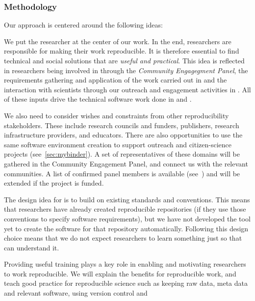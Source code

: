 \subsubsection{Methodology}\label{sec:methodology}

Our approach is centered around the following ideas:
\begin{compactenum}
  \item We put the researcher at the center of our work. In the end,
    researchers are responsible for making their work
    reproducible. It is therefore essential to find technical and social solutions
    that are \emph{useful and practical}. This idea is reflected in researchers
    being involved in  through the \emph{Community Engagegment
    Panel}, the requirements gathering and application of the work carried out
  in  and the interaction with scientists through our
  outreach and engagement activities in . All of these inputs
  drive the technical software work done in  and .
\item We also need to consider wishes and constraints from other reproducibility
  stakeholders. These include research councils and funders, publishers, research
  infrastructure providers, and educators. There are also opportunities to use the same
  software environment creation to support outreach and
  citizen-science projects (see~\ref{sec:mybinder}). A set of representatives of
  these domains will be gathered in the Community Engagement Panel, and connect
  us with the relevant communities. A list of confirmed panel members is
  available (see~) and will be
  extended if the project is funded.
\item The design idea for \repotodocker{} is to build on existing standards and
  conventions. This means that researchers have already created reproducible
  repositories (if they use those conventions to specify software requirements),
  but we have not developed the tool yet to create the software for that
  repository automatically. Following this design choice means that we do not
  expect researchers to learn something just so that \repotodocker{} can
  understand it.
\item Providing useful training plays a key role in enabling and motivating
  researchers to work reproducible. We will explain the benefits for
  reproducible work, and teach good practice for reproducible science such as
  keeping raw data,  meta data and relevant software, using version control and

\end{compactenum}
